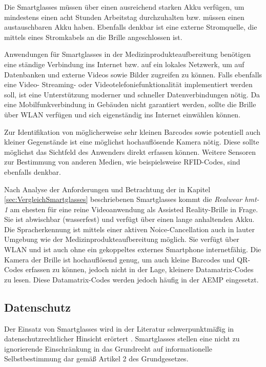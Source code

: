 Die Smartglasses müssen über einen ausreichend starken Akku verfügen, um mindestens einen acht Stunden Arbeitstag durchzuhalten bzw. müssen einen austauschbaren Akku haben. Ebenfalls denkbar ist eine externe Stromquelle, die mittels eines Stromkabels an die Brille angeschlossen ist.

Anwendungen für Smartglasses in der Medizinprodukteaufbereitung benötigen eine ständige Verbindung ins Internet bzw. auf ein lokales Netzwerk, um auf Datenbanken und externe Videos sowie Bilder zugreifen zu können. Falls ebenfalls eine Video- Streaming- oder Videotelefoniefunktionalität implementiert werden soll, ist eine Unterstützung moderner und schneller Datenverbindungen nötig. Da eine Mobilfunkverbindung in Gebäuden nicht garantiert werden, sollte die Brille über WLAN verfügen und sich eigenständig ins Internet einwählen können.

Zur Identifikation von möglicherweise sehr kleinen Barcodes sowie potentiell auch kleiner Gegenstände ist eine möglichst hochauflösende Kamera nötig. Diese sollte möglichst das Sichtfeld des Anwenders direkt erfassen können. Weitere Sensoren zur Bestimmung von anderen Medien, wie beispielsweise RFID-Codes, sind ebenfalls denkbar.
%
%

Nach Analyse der Anforderungen und Betrachtung der in Kapitel \ref{sec:VergleichSmartglasses} beschriebenen Smartglasses kommt die \emph{Realwear hmt-1} am ehesten für eine reine Videoanwendung als Assisted Reality-Brille in Frage. Sie ist abwischbar (wasserfest)
%
%
und verfügt über einen lange anhaltenden Akku. Die Spracherkennung ist mittels einer aktiven Noice-Cancellation auch in lauter Umgebung wie der Medizinprodukteaufbereitung möglich. Sie verfügt über WLAN und ist auch ohne ein gekoppeltes externes Smartphone internetfähig. Die Kamera der Brille ist hochauflösend genug, um auch kleine Barcodes und QR-Codes erfassen zu können, jedoch nicht in der Lage, kleinere Datamatrix-Codes zu lesen. Diese Datamatrix-Codes werden jedoch häufig in der AEMP eingesetzt. 
%
%
%
%
%
%
%
\subsection{Datenschutz}
\label{sec:Datenschutz}
Der Einsatz von Smartglasses wird in der Literatur schwerpunktmäßig in datenschutzrechtlicher Hinsicht erörtert \cite{Berkemeier2017}. Smartglasses stellen eine nicht zu ignorierende Einschränkung in das Grundrecht auf informationelle Selbstbestimmung dar gemäß Artikel 2 des Grundgesetzes.

